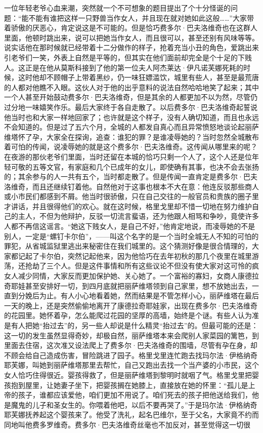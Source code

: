 一位年轻老爷心血来潮，突然就一个不可想象的题目提出了个十分怪诞的问题：“能不能有谁把这样一只野兽当作女人，并且现在就对她如此这般……”大家带着骄傲的厌恶心，肯定说这是不可能的。但是恰巧费多尔·巴夫洛维奇也在这群人里面，他顿时跳出来，说可以把她当作女人，而且很可以，甚至还别有风味等等。说实话他在那时候就已经带着十二分做作的样子，抢着充当小丑的角色，爱跳出来引老爷们一笑，外表上自然是平等的，但其实在他们面前却完全是个十足的下贱人。这正是在他从莫斯科接到了他的第一位夫人阿杰莱达·伊凡诺芙娜死耗的时候，这时他却不顾帽子上带着黑纱，仍一味狂嫖滥饮，城里有些人，甚至是最荒唐的人都对他瞧不入眼。这伙人对于他的出乎意料的说法自然哈哈地笑了起来；其中一个人甚至开始鼓动费多尔·巴夫洛维奇，但是其余的人都更加不以为然，尽管仍过分地一味嬉笑作乐。最后大家终于各自走散了。以后费多尔·巴夫洛维奇起誓说他当时也和大家一样地回家了；也许就是这个样子，没有人确切知道，而且也永远不会知道的。但是过了五六个月，全城的人都发自真心而且异常愤怒地谈论起丽萨维塔怀了孕，大家全在探询，追查：谁犯的罪？是谁凌辱她的？当时忽然全城散布着可怕的传闻，说凌辱她的就是这个费多尔·巴夫洛维奇。这传闻从哪里来的呢？在夜游的那伙老爷们里面，当时还留在本城的恰巧只剩一个人了，这个人还是位年轻可敬的五等文官，有家庭和几个已成年的女儿，即使确有其事，也决不会去张扬的；其余参与的人一共有五个，当时都走散了。但是传闻一直肯定是费多尔·巴夫洛维奇，而且还继续钉着他。自然他对于这事也根本不大在意：他连反驳那些商人或小市民们都感到不屑。他当时很骄傲，只在自己交往的一般官员和贵族的圈子里才讲话，并且很得他们的欢心。就在这时候，格里戈里却不惜一切地在努力维护自己的主人，不但为他辩护，反驳一切流言蜚语，还为他跟人相骂和争吵，竟使许多人都不再信这谣言。“她这下贱女人，是自己不好，”他肯定地说，而凌辱她的不是别人，一定是“螺钉卡尔伯”，——叫这个名字的是一个当时全城无人不知的可怕的罪犯，从省城监狱里逃出来秘密住在我们城里的。这个猜测好像是很合情理的，大家都记起了卡尔伯，突然记起他来，因为他恰巧在去年初秋的那几个夜里在城里游荡，还抢劫了三个人。但是这件事情和所有这些议论不但没有使大家对这可怜的疯女人减少同情，大家反而更加保护她、关心她了。一个富裕的寡妇，女商人康德拉奇耶娃甚至安排好一切，到四月底就把丽萨维塔领到自己家里，想不放她出去，一直到分娩后为止。有人小心地看着她，然而结果是不管怎样小心，丽萨维塔在最后一天的晚上，还是突然偷偷地离开了康德拉奇耶娃家，出现在费多尔·巴夫洛维奇的花园里。她怀着孕，怎么能爬过花园的坚厚的高墙，始终是个谜。有些人认为准是有人把她“抬过去”的，另一些人却说是什么精灵“抬过去”的。但最可能的还是：这一切的发生虽然显得奇妙，却极自然，丽萨维塔本来会爬别人家菜园的篱笆，到里面去住宿，这次准又设法爬上了费多尔·巴夫洛维奇的围墙，尽管有孕在身，却不顾会给自己造成伤害，冒险跳进了园子。格里戈里连忙跑去找玛尔法·伊格纳奇耶芙娜，叫她到丽萨维塔那里去帮忙，自己又跑出去找一个当产婆的小市民，这个女人恰巧住得很近。婴孩得救了，但是丽萨维塔到黎明时就咽了气。格里戈里把婴孩抱到屋里，让她妻子坐下，把婴孩搁在她膝上，直接放在她的怀里：“孤儿是上帝的孩子，谁都应该爱他，咱们更加不用说了。咱们死去的孩子把他送给我们，他是魔鬼的儿子和圣女生的。你喂着他吧，以后不要再哭了。”于是玛尔法·伊格纳奇耶芙娜抚养起这个婴孩来了。他受了洗礼，起名巴维尔，至于父名，大家竟不约而同地叫他费多罗维奇。费多尔·巴夫洛维奇丝毫也不加反对，甚至觉得这一切很